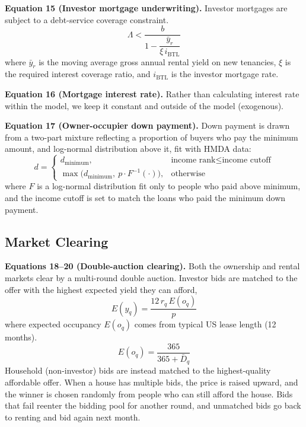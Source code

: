 \documentclass[twocolumn,showpacs,%
  nofootinbib,aps,superscriptaddress,%
  eqsecnum,prd,notitlepage,showkeys,10pt]{revtex4-1}
\begin{document}
\textbf{Equation 15 (Investor mortgage underwriting).} Investor mortgages are subject to a debt-service coverage constraint.
$$
\Lambda < \frac{b}{1 - \dfrac{\bar{y}_r}{\xi\, i_{\text{BTL}}}}
$$
where $\bar{y}_r$ is the moving average gross annual rental yield on new tenancies, $\xi$ is the required interest coverage ratio, and $i_{\text{BTL}}$ is the investor mortgage rate.
 
\textbf{Equation 16 (Mortgage interest rate).} Rather than calculating interest rate within the model, we keep it constant and outside of the model (exogenous). 
 
\textbf{Equation 17 (Owner-occupier down payment).} Down payment is drawn from a two-part mixture reflecting a proportion of buyers who pay the minimum amount, and log-normal distribution above it, fit with HMDA data:
$$
d = \begin{cases} d_{\text{minimum}}, & \text{income rank} \le \text{income cutoff} \\ \max\big(d_{\text{minimum}},\ p \cdot F^{-1}(\cdot)\big), & \text{otherwise} \end{cases}
$$
where $F$ is a log-normal distribution fit only to people who paid above minimum, and the income cutoff is set to match the  loans who paid the minimum down payment.
 
\subsection{Market Clearing}
 
\textbf{Equations 18--20 (Double-auction clearing).} Both the ownership and rental markets clear by a multi-round double auction. Investor bids are matched to the offer with the highest expected yield they can afford,
\begin{equation}
E(y_q) = \frac{12\, r_q\, E(o_q)}{p}
\end{equation}
where expected occupancy $E(o_q)$ comes from typical US lease length (12 months).
\begin{equation}
E(o_q) = \frac{365}{365 + \bar{D}_q}
\end{equation}
Household (non-investor) bids are instead matched to the highest-quality affordable offer. When a house has multiple bids, the price is raised upward, and the winner is chosen randomly from people who can still afford the house. Bids that fail reenter the bidding pool for another round, and unmatched bids go back to renting and bid again next month. 
\end{document}
